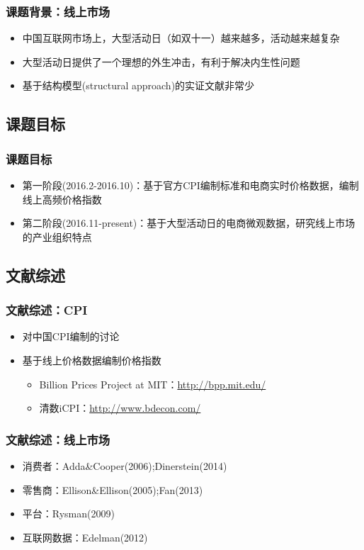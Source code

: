\documentclass{beamer}
\begin{document}
\begin{frame}
\frametitle{课题背景：线上市场}
\begin{itemize}
  \item 中国互联网市场上，大型活动日（如双十一）越来越多，活动越来越复杂
  \item 大型活动日提供了一个理想的外生冲击，有利于解决内生性问题
  \item 基于结构模型(structural approach)的实证文献非常少
\end{itemize}
\end{frame}

\subsection{课题目标}
\begin{frame}
\frametitle{课题目标}
\begin{itemize}
  \item 第一阶段(2016.2-2016.10)：基于官方CPI编制标准和电商实时价格数据，编制线上高频价格指数
  \item 第二阶段(2016.11-present)：基于大型活动日的电商微观数据，研究线上市场的产业组织特点
\end{itemize}
\end{frame}

\subsection{文献综述}
\begin{frame}
\frametitle{文献综述：CPI}
\begin{itemize}
  \item 对中国CPI编制的讨论
  \item 基于线上价格数据编制价格指数
  \begin{itemize}
    \item Billion Prices Project at MIT：\url{http://bpp.mit.edu/}
    \item 清数iCPI：\url{http://www.bdecon.com/}
  \end{itemize}
\end{itemize}
\end{frame}

\begin{frame}
\frametitle{文献综述：线上市场}
\begin{itemize}
  \item 消费者：Adda\&Cooper(2006);Dinerstein(2014)
  \item 零售商：Ellison\&Ellison(2005);Fan(2013)
  \item 平台：Rysman(2009)
  \item 互联网数据：Edelman(2012)
\end{itemize}
\end{frame}
\end{document}
